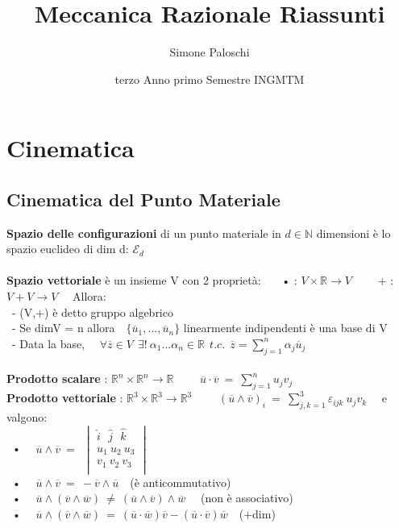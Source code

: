 \documentclass{article}
\title{Meccanica Razionale Riassunti}
\author{Simone Paloschi}
\date{terzo Anno primo Semestre INGMTM}
\begin{document}
\section{Cinematica}


\subsection{Cinematica del Punto Materiale}
%
\textbf{Spazio delle configurazioni} di un punto materiale in $d\in\mathbb{N}$ dimensioni è lo spazio euclideo di dim d: $\mathcal{E}_d$ \\ \\
%
%
%
\textbf{Spazio vettoriale} è un insieme V con 2 proprietà: \ \ \
• : $V\times\mathbb{R}\rightarrow V$ \ \ \ \ + : $V+V\rightarrow V$ \ \ Allora:\\
\ - (V,+) è detto gruppo algebrico\\
\ - Se dimV = n allora  $\ \ \ \{\overline{u}_1,...,\overline{u}_n\}$ linearmente indipendenti è una base di V \\
\ - Data la base, \ \ $\forall \overline{z} \in V \ \ \exists! \ \alpha_1 ... \alpha_n \in\mathbb{R} \ \ t.c. \ \ \overline{z}=\sum_{j=1}^n\alpha_j\overline{u}_j$\\ \\
%
%
%
\textbf{Prodotto scalare} : $\mathbb{R}^n \times\mathbb{R}^n\rightarrow\mathbb{R}$ \ \ \ \ $\overline{u} \cdot \overline{v} \ = \ \sum^n_{j=1}u_jv_j$ \\
\textbf{Prodotto vettoriale} : $\mathbb{R}^3 \times\mathbb{R}^3\rightarrow\mathbb{R}^3$ \ \ \ \ $(\overline{u} \wedge \overline{v})_i \ = \ \sum^3_{j,k=1}\varepsilon_{ijk}\ u_jv_k$ \ \ e valgono:\\
\ • \ \ $\overline{u} \wedge \overline{v} \ = \ \
\begin{vmatrix}
\hat{i} \ \ \ \hat{j}  \ \ \ \hat{k} \\
u_1 \ u_2 \ u_3 \\
v_1 \ v_2 \ v_3 \\
\end{vmatrix}$ \\
\ • \ \ $\overline{u} \wedge \overline{v} \ = \ - \overline{v} \wedge \overline{u}$\ \ (è anticommutativo) \\
\ • \ \ $\overline{u} \wedge (\overline{v} \wedge \overline{w}) \ \neq \ (\overline{u} \wedge \overline{v}) \wedge \overline{w}$ \ \ (non è associativo)\\
\ • \ \ $\overline{u} \wedge (\overline{v} \wedge \overline{w}) \ = \ (\overline{u}\cdot\overline{w})\overline{v} - (\overline{u}\cdot\overline{v})\overline{w}$\ \ (+dim) \\
\end{document}
